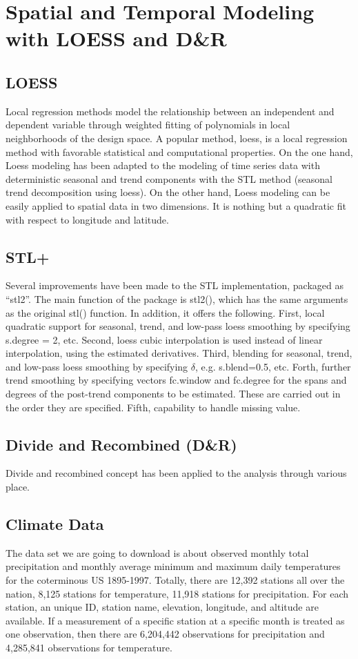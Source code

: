 \section{Spatial and Temporal Modeling with LOESS and D\&R}

\subsection{LOESS}
Local regression methods model the relationship between an independent and dependent variable 
through weighted fitting of polynomials in local neighborhoods of the design space. A popular 
method, loess, is a local regression method with favorable statistical and computational properties.
On the one hand, Loess modeling has been adapted to the modeling of time series data with 
deterministic seasonal and trend components with the STL method (seasonal trend decomposition using 
loess). On the other hand, Loess modeling can be easily applied to spatial data in two dimensions. 
It is nothing but a quadratic fit with respect to longitude and latitude. 

\subsection{STL+}
Several improvements have been made to the STL implementation, packaged as “stl2”. The main function
of the package is stl2(), which has the same arguments as the original stl() function. In addition, 
it offers the following. First, local quadratic support for seasonal, trend, and low-pass loess 
smoothing by specifying s.degree = 2, etc. Second, loess cubic interpolation is used instead of 
linear interpolation, using the estimated derivatives. Third, blending for seasonal, trend, and 
low-pass loess smoothing by specifying $\delta$, e.g. s.blend=0.5, etc. Forth, further trend 
smoothing by specifying vectors fc.window and fc.degree for the spans and degrees of the post-trend 
components to be estimated. These are carried out in the order they are specified. Fifth, capability
to handle missing value.

\subsection{Divide and Recombined (D\&R)}
Divide and recombined concept has been applied to the analysis through various place. 

\subsection{Climate Data}
The data set we are going to download is about observed monthly total precipitation and monthly 
average minimum and maximum daily temperatures for the coterminous US 1895-1997. Totally, there are 
12,392 stations all over the nation, 8,125 stations for temperature, 11,918 stations for 
precipitation. For each station, an unique ID, station name, elevation, longitude, and altitude are
available. If a measurement of a specific station at a specific month is treated as one observation,
then there are 6,204,442 observations for precipitation and 4,285,841 observations for temperature. 

